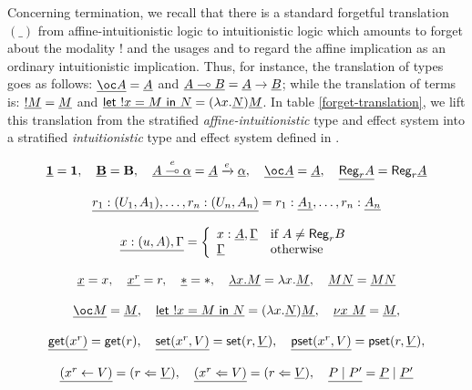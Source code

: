 \documentclass[11pt]{article}
\newcommand{\arrow}{\rightarrow}        \newcommand{\trarrow}{\stackrel{*}{\rightarrow}}        \newcommand{\limp}{\multimap} \newcommand{\bang}{\oc}
\newcommand{\limpe}[1]{\stackrel{#1}{\multimap}}
\newcommand{\hyp}[3]{#1:(#2, #3)}
\newcommand{\letm}[3]{{\sf let} \ ! #1 = #2 \ {\sf in} \ #3}    \newcommand{\tertype}{{\bf 1}}
\newcommand{\behtype}{{\bf B}}
\newcommand{\act}[1]{\xrightarrow{#1}}
\newcommand{\pst}[2]{{\sf pset}(#1,#2)}
\newcommand{\st}[2]{{\sf set}(#1,#2)}
\newcommand{\get}[1]{{\sf get}(#1)}
\newcommand{\new}[2]{\nu #1 \ #2}
\newcommand{\store}[2]{(#1 \leftarrow #2)}
\newcommand{\pstore}[2]{(#1 \Leftarrow #2)}
\newcommand{\regtype}[2]{{\sf Reg}_{#1} #2}
\begin{document}
Concerning termination, we recall that
there is a standard forgetful translation $(\_)$ from
affine-intuitionistic logic to intuitionistic logic which amounts to
forget about the modality $!$ and the usages and to regard the affine
implication as an ordinary intuitionistic implication.  Thus, for
instance, the translation of types goes as follows:
$\forget{\bang A} = \forget{A}$ and 
$\forget{A\limp B} = \forget{A}\arrow \forget{B}$;
while the translation of terms is:
$\underline{!M}=\underline{M}$ and  \quad 
$\forget{\letm{x}{M}{N}} = (\lambda x.\forget{N})\forget{M}$.
In table \ref{forget-translation}, we lift this translation from the
stratified {\em affine-intuitionistic} type and effect system into a
stratified {\em intuitionistic} type and effect system defined in
\cite{Amadio09}.  
\begin{table}
{\footnotesize
\[
\begin{array}{c}

\forget{\tertype} =\tertype,\quad
\forget{\behtype} = \behtype,\quad
\forget{A\limpe{e}\alpha} = \forget{A}\act{e} \forget{\alpha}, \quad
\forget{\bang A} = \forget{A},\quad 
\forget{\regtype{r}{A}} = \regtype{r}{\forget{A}} \\ \\  


\forget{ \hyp{r_{1}}{U_{1}}{A_{1}},\ldots,\hyp{r_{n}}{U_{n}}{A_{n}}} = 
r_1:\forget{A_{1}},\ldots,r_n:\forget{A_{n}} \\ \\

\forget{\hyp{x}{u}{A},\Gamma} = \left\{
\begin{array}{ll} 
x:\forget{A},\forget{\Gamma} &\mbox{if }A\neq \regtype{r}{B} \\
\forget{\Gamma}              &\mbox{otherwise} 
\end{array}
\right. \\ \\


\forget{x} = x, 
\quad \forget{x^{r}} = r, 
\quad
\forget{*} = *, 
\quad
\forget{\lambda x.M} = \lambda x.\forget{M}, 
\quad
\forget{MN} = \forget{M}\forget{N} \\ \\

\forget{\bang M} = \forget{M},
\quad
\forget{\letm{x}{M}{N}} = (\lambda x.\forget{N})\forget{M}, 
\quad
\forget{\new{x}{M}} = \forget{M}, \\ \\

\forget{\get{x^{r}}} = \get{r}, 
\quad
\forget{\st{x^{r}}{V}} = \st{r}{\forget{V}},
\quad
\forget{\pst{x^{r}}{V}} = \pst{r}{\forget{V}}, \\ \\ 

\forget{\store{x^{r}}{V}} = \pstore{r}{\forget{V}},
\quad
\forget{\pstore{x^{r}}{V}} = \pstore{r}{\forget{V}},
\quad
\forget{P\mid P'} = \forget{P}\mid \forget{P'}

\end{array}
\]}
\caption{Forgetful translation}\label{forget-translation}
\end{table}
\end{document}
